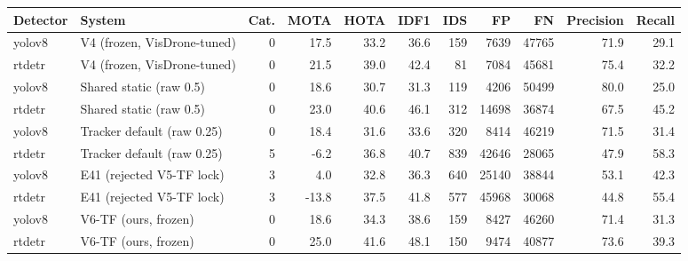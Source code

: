 \begin{tabular}{llrrrrrrrrr}
\toprule
Detector & System & Cat. & MOTA & HOTA & IDF1 & IDS & FP & FN & Precision & Recall \\
\midrule
yolov8 & V4 (frozen, VisDrone-tuned) & 0 & 17.5 & 33.2 & 36.6 & 159 & 7639 & 47765 & 71.9 & 29.1 \\
rtdetr & V4 (frozen, VisDrone-tuned) & 0 & 21.5 & 39.0 & 42.4 & 81 & 7084 & 45681 & 75.4 & 32.2 \\
yolov8 & Shared static (raw 0.5) & 0 & 18.6 & 30.7 & 31.3 & 119 & 4206 & 50499 & 80.0 & 25.0 \\
rtdetr & Shared static (raw 0.5) & 0 & 23.0 & 40.6 & 46.1 & 312 & 14698 & 36874 & 67.5 & 45.2 \\
yolov8 & Tracker default (raw 0.25) & 0 & 18.4 & 31.6 & 33.6 & 320 & 8414 & 46219 & 71.5 & 31.4 \\
rtdetr & Tracker default (raw 0.25) & 5 & -6.2 & 36.8 & 40.7 & 839 & 42646 & 28065 & 47.9 & 58.3 \\
yolov8 & E41 (rejected V5-TF lock) & 3 & 4.0 & 32.8 & 36.3 & 640 & 25140 & 38844 & 53.1 & 42.3 \\
rtdetr & E41 (rejected V5-TF lock) & 3 & -13.8 & 37.5 & 41.8 & 577 & 45968 & 30068 & 44.8 & 55.4 \\
yolov8 & V6-TF (ours, frozen) & 0 & 18.6 & 34.3 & 38.6 & 159 & 8427 & 46260 & 71.4 & 31.3 \\
rtdetr & V6-TF (ours, frozen) & 0 & 25.0 & 41.6 & 48.1 & 150 & 9474 & 40877 & 73.6 & 39.3 \\
\bottomrule
\end{tabular}
